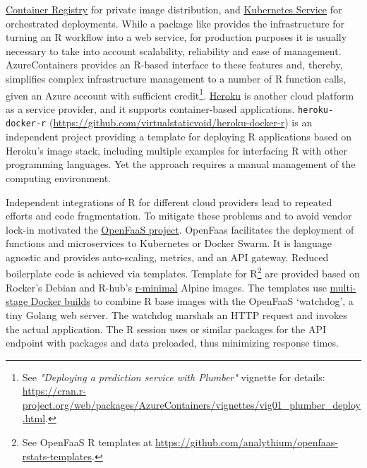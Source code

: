 \href{https://azure.microsoft.com/en-us/services/container-registry/}{Container
Registry} for private image distribution, and
\href{https://azure.microsoft.com/en-us/services/kubernetes-service/}{Kubernetes
Service} for orchestrated deployments. While a package like
 provides the infrastructure for turning an R workflow into
a web service, for production purposes it is usually necessary to take
into account scalability, reliability and ease of management.
AzureContainers provides an R-based interface to these features and,
thereby, simplifies complex infrastructure management to a number of R
function calls, given an Azure account with sufficient
credit\footnote{See \emph{"Deploying a prediction service with Plumber"} vignette for details:  \href{https://cran.r-project.org/web/packages/AzureContainers/vignettes/vig01_plumber_deploy.html}{https://cran.r-project.org/web/packages/AzureContainers/vignettes/vig01\_plumber\_deploy.html}.}.
\href{https://www.heroku.com/}{Heroku} is another cloud platform as a
service provider, and it supports container-based applications.
\texttt{heroku-docker-r}
(\url{https://github.com/virtualstaticvoid/heroku-docker-r}) is an
independent project providing a template for deploying R applications
based on Heroku's image stack, including multiple examples for
interfacing R with other programming languages. Yet the approach
requires a manual management of the computing environment.

Independent integrations of R for different cloud providers lead to
repeated efforts and code fragmentation. To mitigate these problems and
to avoid vendor lock-in motivated the
\href{https://www.openfaas.com/}{OpenFaaS project}. OpenFaas facilitates
the deployment of functions and microservices to Kubernetes or Docker
Swarm. It is language agnostic and provides auto-scaling, metrics, and
an API gateway. Reduced boilerplate code is achieved via templates.
Template for
R\footnote{See OpenFaaS R templates at \href{https://github.com/analythium/openfaas-rstats-templates}{https://github.com/analythium/openfaas-rstats-templates}.}
are provided based on Rocker's Debian and R-hub's
\href{https://github.com/r-hub/r-minimal}{r-minimal} Alpine images. The
templates use
\href{https://docs.docker.com/develop/develop-images/multistage-build/}{multi-stage
Docker builds} to combine R base images with the OpenFaaS `watchdog', a
tiny Golang web server. The watchdog marshals an HTTP request and
invokes the actual application. The R session uses  or
similar packages for the API endpoint with packages and data preloaded,
thus minimizing response times.

